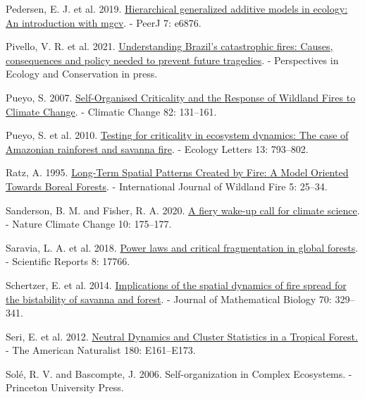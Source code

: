 \documentclass[
]{article}
\newlength{\cslhangindent}
\newenvironment{CSLReferences}[2] %
 {\begin{list}{}{%
  \setlength{\itemindent}{0pt}
  \setlength{\leftmargin}{0pt}
  \setlength{\parsep}{0pt}
  \ifodd #1
   \setlength{\leftmargin}{\cslhangindent}
   \setlength{\itemindent}{-1\cslhangindent}
  \fi
  \setlength{\itemsep}{#2\baselineskip}}}
 {\end{list}}
\begin{document}
\begin{CSLReferences}{1}{1}
Pedersen, E. J. et al. 2019.
\href{https://doi.org/10.7717/peerj.6876}{Hierarchical generalized
additive models in ecology: An introduction with mgcv}. - PeerJ 7:
e6876.

Pivello, V. R. et al. 2021.
\href{https://doi.org/10.1016/j.pecon.2021.06.005}{Understanding
{Brazil}'s catastrophic fires: {Causes}, consequences and policy needed
to prevent future tragedies}. - Perspectives in Ecology and Conservation
in press.

Pueyo, S. 2007.
\href{https://doi.org/10.1007/s10584-006-9134-2}{Self-{Organised
Criticality} and the {Response} of {Wildland Fires} to {Climate
Change}}. - Climatic Change 82: 131--161.

Pueyo, S. et al. 2010.
\href{https://doi.org/10.1111/j.1461-0248.2010.01497.x}{Testing for
criticality in ecosystem dynamics: The case of {Amazonian} rainforest
and savanna fire}. - Ecology Letters 13: 793--802.

Ratz, A. 1995. \href{https://doi.org/10.1071/wf9950025}{Long-{Term
Spatial Patterns Created} by {Fire}: A {Model Oriented Towards Boreal
Forests}}. - International Journal of Wildland Fire 5: 25--34.

Sanderson, B. M. and Fisher, R. A. 2020.
\href{https://doi.org/10.1038/s41558-020-0707-2}{A fiery wake-up call
for climate science}. - Nature Climate Change 10: 175--177.

Saravia, L. A. et al. 2018.
\href{https://doi.org/10.1038/s41598-018-36120-w}{Power laws and
critical fragmentation in global forests}. - Scientific Reports 8:
17766.

Schertzer, E. et al. 2014.
\href{https://doi.org/10.1007/s00285-014-0757-z}{Implications of the
spatial dynamics of fire spread for the bistability of savanna and
forest}. - Journal of Mathematical Biology 70: 329--341.

Seri, E. et al. 2012. \href{https://doi.org/10.1086/668125}{Neutral
{Dynamics} and {Cluster Statistics} in a {Tropical Forest}.} - The
American Naturalist 180: E161--E173.

Solé, R. V. and Bascompte, J. 2006. Self-organization in {Complex
Ecosystems}. - {Princeton University Press}.


\end{CSLReferences}
\end{document}
